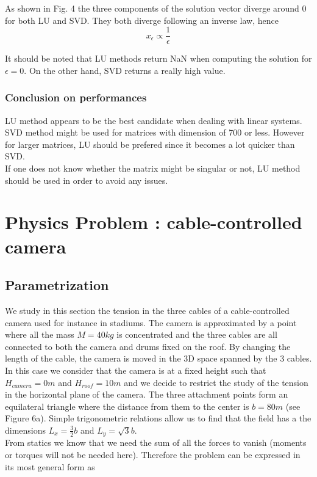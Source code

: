 \documentclass[10 pt]{article}
\begin{document}
\begin{multicols}{2}
As shown in Fig. 4 the three components of the solution vector diverge around 0 for both LU and SVD. They both diverge following an inverse law, hence
\begin{equation}
x_{\epsilon} \propto \frac{1}{\epsilon}
\end{equation}

It should be noted that LU methods return NaN when computing the solution for $\epsilon = 0$. On the other hand, SVD returns a really high value.\\

\subsubsection{Conclusion on performances}

LU method appears to be the best candidate when dealing with linear systems. SVD method might be used for matrices with dimension of 700 or less. However for larger matrices, LU should be prefered since it becomes a lot quicker than SVD.\\
If one does not know whether the matrix might be singular or not, LU method should be used in order to avoid any issues.

\section{Physics Problem : cable-controlled camera}

\subsection{Parametrization}
We study in this section the tension in the three cables of a cable-controlled camera used for instance in stadiums. The camera is approximated by a point where all the mass $M = 40 kg$ is concentrated and the three cables are all connected to both the camera and drums fixed on the roof.
By changing the length of the cable, the camera is moved in the 3D space spanned by the 3 cables. In this case we consider that the camera is at a fixed height such that $H_{camera} = 0 m$ and $H_{roof} = 10 m$ and we decide to restrict the study of the tension in the horizontal plane of the camera. The three attachment points form an equilateral triangle where the distance from them to the center is $b = 80 m$ (see Figure 6a). Simple trigonometric relations allow us to find that the field has a the dimensions $L_x = \frac{3}{2}b$ and $L_y = \sqrt{3}b$.\\
From statics we know that we need the sum of all the forces to vanish (moments or torques will not be needed here). Therefore the problem can be expressed in its most general form as


\end{multicols}
\end{document}
